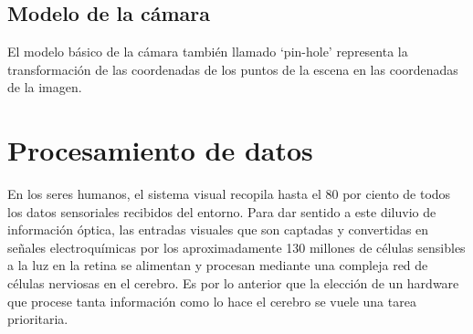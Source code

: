 \subsection{Modelo de la cámara}
El modelo básico de la cámara también llamado
‘pin-hole’ representa la transformación de las
coordenadas de los puntos de la escena en las
coordenadas de la imagen. \cite{Paper::Ricolfe2008}



\section{Procesamiento de datos}
En los seres humanos, el sistema visual recopila hasta el 80 por ciento de todos los datos sensoriales recibidos del entorno.
Para dar sentido a este diluvio de información óptica, las entradas visuales que son captadas y convertidas en señales
electroquímicas por los aproximadamente 130 millones de células sensibles a la luz en la retina se alimentan y procesan mediante
una compleja red de células nerviosas en el cerebro.\cite{WEB:Cerebro}
Es por lo anterior que la elección de un hardware que procese tanta información como lo hace el cerebro se vuele una tarea
prioritaria.

